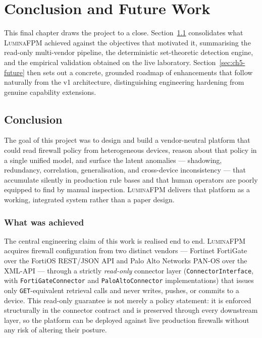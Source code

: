 \chapter{Conclusion and Future Work}
\label{sec:ch5-intro}

This final chapter draws the project to a close. Section~\ref{sec:ch5-conclusion} consolidates what \textsc{LuminaFPM} achieved against the objectives that motivated it, summarising the read-only multi-vendor pipeline, the deterministic set-theoretic detection engine, and the empirical validation obtained on the live laboratory. Section~\ref{sec:ch5-future} then sets out a concrete, grounded roadmap of enhancements that follow naturally from the v1 architecture, distinguishing engineering hardening from genuine capability extensions.

\section{Conclusion}
\label{sec:ch5-conclusion}

The goal of this project was to design and build a vendor-neutral platform that could read firewall policy from heterogeneous devices, reason about that policy in a single unified model, and surface the latent anomalies --- shadowing, redundancy, correlation, generalisation, and cross-device inconsistency --- that accumulate silently in production rule bases and that human operators are poorly equipped to find by manual inspection. \textsc{LuminaFPM} delivers that platform as a working, integrated system rather than a paper design.

\subsection{What was achieved}
\label{sec:ch5-achieved}

The central engineering claim of this work is realised end to end. \textsc{LuminaFPM} acquires firewall configuration from two distinct vendors --- Fortinet FortiGate over the FortiOS REST/JSON API and Palo Alto Networks PAN-OS over the XML-API --- through a strictly \emph{read-only} connector layer (\texttt{ConnectorInterface}, with \texttt{FortiGateConnector} and \texttt{PaloAltoConnector} implementations) that issues only \texttt{GET}-equivalent retrieval calls and never writes, pushes, or commits to a device. This read-only guarantee is not merely a policy statement: it is enforced structurally in the connector contract and is preserved through every downstream layer, so the platform can be deployed against live production firewalls without any risk of altering their posture.

